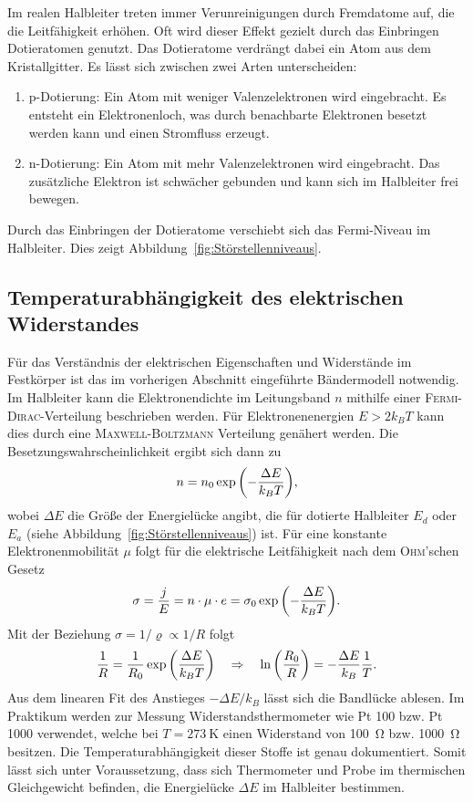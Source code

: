 \documentclass[parskip=half, a4paper,twoside,final]{article}
\begin{document}
Im realen Halbleiter treten immer Verunreinigungen durch Fremdatome auf, die die Leitfähigkeit erhöhen. Oft wird dieser Effekt gezielt durch das Einbringen Dotieratomen genutzt. Das Dotieratome verdrängt dabei ein Atom aus dem Kristallgitter. Es lässt sich zwischen zwei Arten unterscheiden:
\begin{enumerate}
  \item p-Dotierung: Ein Atom mit weniger Valenzelektronen wird eingebracht. Es entsteht ein Elektronenloch, was durch benachbarte Elektronen besetzt werden kann und einen Stromfluss erzeugt.
  \item n-Dotierung: Ein Atom mit mehr Valenzelektronen wird eingebracht. Das zusätzliche Elektron ist schwächer gebunden und kann sich im Halbleiter frei bewegen.
\end{enumerate}

Durch das Einbringen der Dotieratome verschiebt sich das Fermi-Niveau im Halbleiter. Dies zeigt Abbildung~\ref{fig:Störstellenniveaus}.


\subsection{Temperaturabhängigkeit des elektrischen Widerstandes}
Für das Verständnis der elektrischen Eigenschaften und Widerstände im Festkörper ist das im vorherigen Abschnitt eingeführte Bändermodell notwendig. Im Halbleiter kann die Elektronendichte im Leitungsband $n$ mithilfe einer \textsc{Fermi-Dirac}-Verteilung beschrieben werden. Für Elektronenenergien $E > 2k_B T$ kann dies durch eine \textsc{Maxwell-Boltzmann} Verteilung genähert werden. Die Besetzungswahrscheinlichkeit ergibt sich dann zu~\cite{Thurk}
\begin{align}
  n = n_0 \exp\qty(-\frac{\Delta E}{k_B T}),
\end{align}
wobei $\Delta E$ die Größe der Energielücke angibt, die für dotierte Halbleiter $E_d$ oder $E_a$ (siehe Abbildung~\ref{fig:Störstellenniveaus}) ist.
Für eine konstante Elektronenmobilität $\mu$ folgt für die elektrische Leitfähigkeit nach dem \textsc{Ohm}'schen Gesetz~\cite{Thurk}
\begin{align}
  \sigma = \frac{j}{E} = n \cdot \mu \cdot e = \sigma_0 \exp\qty(-\frac{\Delta E}{k_B T}).
\end{align}
Mit der Beziehung $\sigma = 1/\varrho \propto 1/R$ folgt
\begin{align}
  \frac{1}{R} = \frac{1}{R_0} \exp\qty(\frac{\Delta E}{k_B T}) \quad \Rightarrow \quad \ln\qty(\frac{R_0}{R}) = -\frac{\Delta E}{k_B}\frac{1}{T}.
\end{align}
Aus dem linearen Fit des Anstieges $-\Delta E/k_B$ lässt sich die Bandlücke ablesen. Im Praktikum werden zur Messung Widerstandsthermometer wie Pt 100 bzw. Pt 1000 verwendet, welche bei $T = \SI{273}{\kelvin}$ einen Widerstand von \SI{100}{\ohm} bzw. \SI{1000}{\ohm} besitzen. Die Temperaturabhängigkeit dieser Stoffe ist genau dokumentiert. Somit lässt sich unter Voraussetzung, dass sich Thermometer und Probe im thermischen Gleichgewicht befinden, die Energielücke $\Delta E$ im Halbleiter bestimmen.
\end{document}
